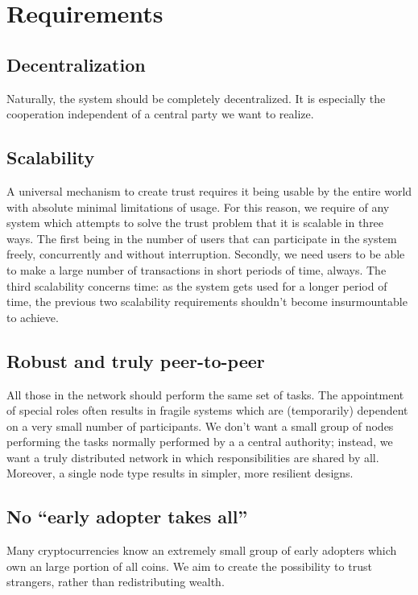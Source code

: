 \chapter{Requirements}
\section{Decentralization}
Naturally, the system should be completely decentralized. It is especially the cooperation independent of a central party we want to realize.

\section{Scalability}
A universal mechanism to create trust requires it being usable by the entire world with absolute minimal limitations of usage. For this reason, we require of any system which attempts to solve the trust problem that it is scalable in three ways. The first being in the number of users that can participate in the system freely, concurrently and without interruption. Secondly, we need users to be able to make a large number of transactions in short periods of time, always. The third scalability concerns time: as the system gets used for a longer period of time, the previous two scalability requirements shouldn't become insurmountable to achieve.

\section{Robust and truly peer-to-peer}
All those in the network should perform the same set of tasks. The appointment of special roles often results in fragile systems which are (temporarily) dependent on a very small number of participants. We don't want a small group of nodes performing the tasks normally performed by a a central authority; instead, we want a truly distributed network in which responsibilities are shared by all. Moreover, a single node type results in simpler, more resilient designs. 

\section{No ``early adopter takes all''}
Many cryptocurrencies know an extremely small group of early adopters which own an large portion of all coins. We aim to create the possibility to trust strangers, rather than redistributing wealth.
